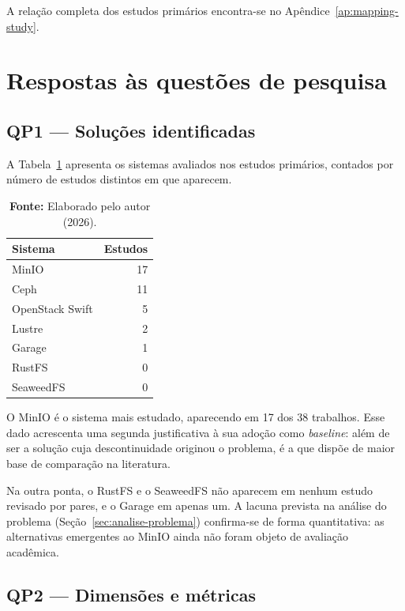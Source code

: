 A relação completa dos estudos primários encontra-se no
Apêndice~\ref{ap:mapping-study}.

\section{Respostas às questões de pesquisa}
\label{sec:sintese}

\subsection{QP1 --- Soluções identificadas}

A Tabela~\ref{tab:sistemas} apresenta os sistemas avaliados nos estudos
primários, contados por número de estudos distintos em que aparecem.

\begin{table}[htb]
\centering
\caption{Sistemas de armazenamento de objetos avaliados nos estudos primários.}
\label{tab:sistemas}
\begin{tabular}{@{}lr@{}}
\toprule
\textbf{Sistema} & \textbf{Estudos} \\
\midrule
MinIO            & 17 \\
Ceph             & 11 \\
OpenStack Swift  & 5 \\
Lustre           & 2 \\
Garage           & 1 \\
RustFS           & 0 \\
SeaweedFS        & 0 \\
\bottomrule
\end{tabular}
\caption*{\textbf{Fonte:} Elaborado pelo autor (2026).}
\end{table}

O MinIO é o sistema mais estudado, aparecendo em 17 dos 38 trabalhos. Esse dado
acrescenta uma segunda justificativa à sua adoção como \textit{baseline}: além
de ser a solução cuja descontinuidade originou o problema, é a que dispõe de
maior base de comparação na literatura.

Na outra ponta, o RustFS e o SeaweedFS não aparecem em nenhum estudo revisado
por pares, e o Garage em apenas um. A lacuna prevista na análise do problema
(Seção~\ref{sec:analise-problema}) confirma-se de forma quantitativa: as
alternativas emergentes ao MinIO ainda não foram objeto de avaliação acadêmica.

\subsection{QP2 --- Dimensões e métricas}

